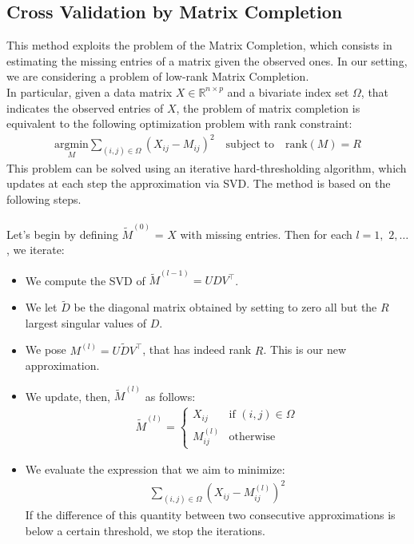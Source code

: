 \documentclass{article}
\begin{document}
\subsection{Cross Validation by Matrix Completion}
This method exploits the problem of the Matrix Completion, which consists in estimating the missing entries of a matrix given the observed ones. In our setting,
we are considering a problem of low-rank Matrix Completion. \\
In particular, given a data matrix $X \in \mathbb{R}^{n \times p}$ and a bivariate index set $\Omega$, that indicates the observed entries of $X$,
the problem of matrix completion is equivalent to the following optimization problem with rank constraint:
\begin{gather*}
    \underset{M}{\text{argmin}} \sum_{(i,j) \in \Omega} (X_{ij} - M_{ij})^2 \quad \text{subject to} \quad \text{rank}(M) = R
\end{gather*}
This problem can be solved using an iterative hard-thresholding algorithm, which updates at each step the approximation via SVD. The method is based on the 
following steps.\\ \\
Let's begin by defining $\tilde{M}^{(0)}$ = $X$ with missing entries. Then for each $l = 1,$ $2, \dots$, we iterate:
\begin{itemize}
    \item We compute the SVD of $\tilde{M}^{(l-1)} = U D V^\top$.
    \item We let $\tilde{D}$ be the diagonal matrix obtained by setting to zero all but the $R$ largest singular values of $D$.
    \item We pose ${M}^{(l)} = U \tilde{D} V^\top$, that has indeed rank $R$. This is our new approximation.
    \item We update, then, $\tilde{M}^{(l)}$ as follows:
    \begin{gather*}
        \tilde{M}^{(l)} = \begin{cases} 
        X_{ij} & \text{if } (i,j) \in \Omega \\
        M^{(l)}_{ij} & \text{otherwise}
        \end{cases}
    \end{gather*}
    \item We evaluate the expression that we aim to minimize:
    \begin{gather*}
        \sum_{(i,j) \in \Omega} (X_{ij} - M^{(l)}_{ij})^2
    \end{gather*}
        If the difference of this quantity between two consecutive approximations is below a certain threshold, we stop the iterations.
\end{itemize}
\end{document}
